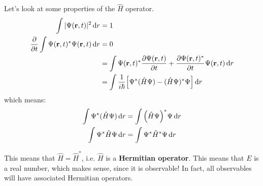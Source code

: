 Let's look at some properties of the $\hat{H}$ operator.
\begin{align*}
    \int |\Psi(\mbf{r}, t)|^2 \dd{r} &= 1 \\
    \partialderivative{}{t} \int \Psi(\mbf{r}, t)^* \Psi(\mbf{r}, t) \dd{r} &= 0 \\
    &= \int \Psi(\mbf{r}, t)^* \partialderivative{\Psi(\mbf{r}, t)}{t} + \partialderivative{\Psi(\mbf{r}, t)^*}{t} \Psi(\mbf{r}, t) \dd{r} \\
    &= \int \frac{1}{i \hbar} \qty[\Psi^* (\hat{H} \Psi) - (\hat{H} \Psi)^* \Psi] \dd{r} \\
\end{align*}
which means:
\begin{align*}
    \int \Psi^*(\hat{H} \Psi) \dd{r} &= \int \qty(\hat{H} \Psi)^* \Psi \dd{r} \\
    \int \Psi^* \hat{H} \Psi \dd{r} &= \int \Psi^* \hat{H}^* \Psi \dd{r}
\end{align*}

This means that $\hat{H} = \hat{H}^*$, i.e. $\hat{H}$ is a \textbf{Hermitian operator}. This means that $E$ is a real number, which makes sense,
since it is observable! In fact, all observables will have associated Hermitian operators.